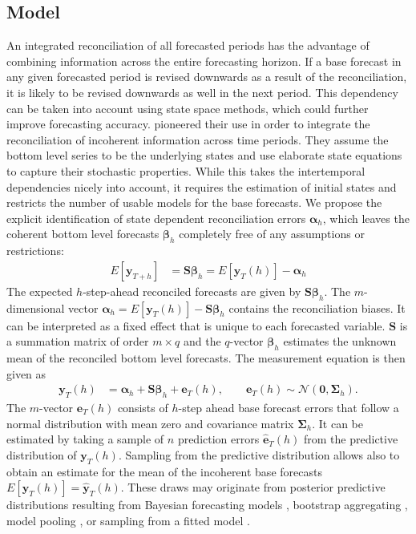 \documentclass[a4paper,fleqn,11pt]{article}
\begin{document}
\subsection{Model}
An integrated reconciliation of all forecasted periods has the advantage of combining information across the entire forecasting horizon. If a base forecast in any given forecasted period is revised downwards as a result of the reconciliation, it is likely to be revised downwards as well in the next period. This dependency can be taken into account using state space methods, which could further improve forecasting accuracy. \cite{Pennings2017} pioneered their use in order to integrate the reconciliation of incoherent information across time periods. They assume the bottom level series to be the underlying states and use elaborate state equations to capture their stochastic properties. While this takes the intertemporal dependencies nicely into account, it requires the estimation of initial states and restricts the number of usable models for the base forecasts. We propose the explicit identification of state dependent reconciliation errors $\boldsymbol{\alpha}_h$, which leaves the coherent bottom level forecasts $\boldsymbol{\beta}_h$ completely free of any assumptions or restrictions:
\begin{align}
	\label{eq:main}
	E\left[\textbf{y}_{T+h}\right] & = \textbf{S} \boldsymbol{\beta}_h = E\left[\mathbf{y}_{T}(h)\right] - \boldsymbol{\alpha}_h
\end{align}
The expected $h$-step-ahead reconciled forecasts are given by $\textbf{S} \boldsymbol{\beta}_h$.  The $m$-dimensional vector $\boldsymbol{\alpha}_h = E\left[\mathbf{y}_{T}(h)\right] - \textbf{S} \boldsymbol{\beta}_h$ contains the reconciliation biases. It can be interpreted as a fixed effect that is unique to each forecasted variable. $\textbf{S}$ is a summation matrix of order $m \times q$ and the $q$-vector $\boldsymbol{\beta}_h$ estimates the unknown mean of the reconciled bottom level forecasts. The measurement equation is then given as
\begin{align}
\label{eq:meas1}
\mathbf{y}_{T}(h) &  = \boldsymbol{\alpha}_h + \textbf{S} \boldsymbol{\beta}_h + \mathbf{e}_{T}(h), \qquad \mathbf{e}_{T}(h) \sim \mathcal{N}(\textbf{0}, \boldsymbol{\Sigma}_h).
\end{align}
The $m$-vector $\mathbf{e}_{T}(h)$ consists of $h$-step ahead base forecast errors that follow a normal distribution with mean zero and covariance matrix $\boldsymbol{\Sigma}_h$. It can be estimated by taking a sample of $n$ prediction errors $\mathbf{\hat{e}}_{T}(h)$ from the predictive distribution of $\mathbf{y}_{T}(h) $. Sampling from the predictive distribution allows also to obtain an estimate for the mean of the incoherent base forecasts $E\left[\mathbf{y}_{T}(h)\right] = \mathbf{\hat{y}}_{T}(h)$.  These draws may originate from posterior predictive distributions resulting from Bayesian forecasting models \citep{Cesur2016}, bootstrap aggregating \citep{Bergmeir2016}, model pooling \citep{Timmermann2006,Kapetanios2015}, or sampling from a fitted model \citep{Hyndman2018}. 
\end{document}
